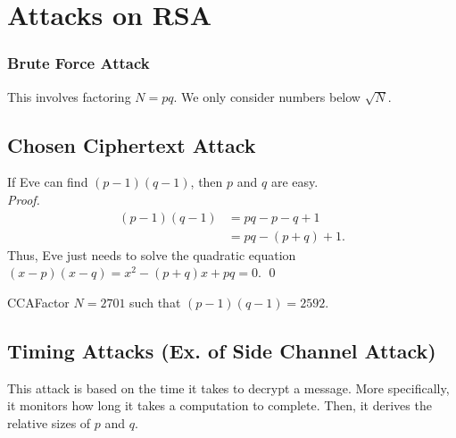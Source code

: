 \section{Attacks on RSA}

\subsubsection{Brute Force Attack}

This involves factoring \(N = pq\). We only consider numbers below \(\sqrt{N}\).

\hypertarget{sec:Ciphertext Attack}{}

\subsection{Chosen Ciphertext Attack}

If Eve can find \((p-1)(q-1)\), then \(p\) and \(q\) are easy.  \\

\noindent \textit{Proof.} \begin{align*}
    (p-1)(q-1) & = pq - p - q + 1   \\
               & = pq - (p +q) + 1.
\end{align*} Thus, Eve just needs to solve the quadratic equation \((x-p)(x-q) = x^2 - (p+q)x + pq = 0\). \qed

\begin{example}
    {CCA}Factor \(N = 2701\) such that \((p-1)(q - 1) = 2592\).
\end{example}


\subsection{Timing Attacks (Ex. of Side Channel Attack)}

This attack is based on the time it takes to decrypt a message. More specifically, it monitors how long it takes a computation to complete. Then, it derives the relative sizes of \(p\) and \(q\).


